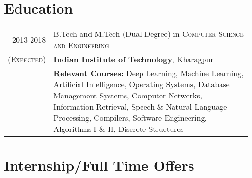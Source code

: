 \documentclass[a4paper,10pt]{extarticle} %
\begin{document}
\section{\large{Education}}

\begin{tabular}{r|p{16cm}}	
\normalsize{2013-2018} & \small{B.Tech and M.Tech (Dual Degree) in} \textsc{\small{Computer Science and Engineering}}\\
\textsc{\normalsize{(Expected)}}&\small{\textbf{Indian Institute of Technology}, Kharagpur}\\
&\textbf{Relevant Courses: }\small{{Deep Learning, Machine Learning, Artificial Intelligence, Operating Systems, Database Management Systems, Computer Networks, Information Retrieval, Speech \& Natural Language Processing, Compilers, Software Engineering, Algorithms-I \& II, Discrete Structures}}\\






\end{tabular}

\section{\large{Internship/Full Time Offers}}
\end{document}
